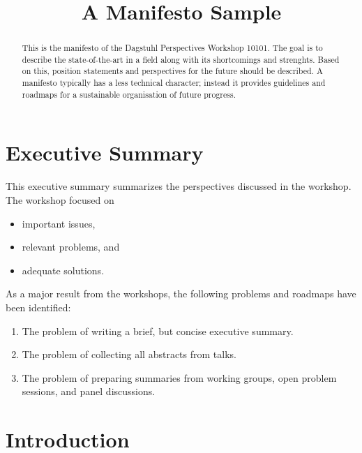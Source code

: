 \documentclass[a4paper,UKenglish]{dagman-v2021}
\title{A Manifesto Sample}
\begin{document}
\maketitle

\begin{abstract}
This is the manifesto of the Dagstuhl Perspectives Workshop 10101.  The goal is to describe the state-of-the-art in a field along with its shortcomings and strenghts. Based on this, position statements and perspectives for the future should be described. A manifesto typically has a less technical character; instead it provides guidelines and roadmaps for a sustainable organisation of future progress. 
\end{abstract}

\section*{Executive Summary}

This executive summary summarizes the perspectives discussed in the workshop. The workshop focused on\begin{itemize}
\item important issues,
\item relevant problems, and
\item adequate solutions.
\end{itemize}

As a major result from the workshops, the following problems and roadmaps have been identified: 
\begin{enumerate}
\item The problem of writing a brief, but concise executive summary.
\item The problem of collecting all abstracts from talks.
\item The problem of preparing summaries from working groups, open problem sessions, and panel discussions.
\end{enumerate}

\tableofcontents


\section{Introduction}
\end{document}
